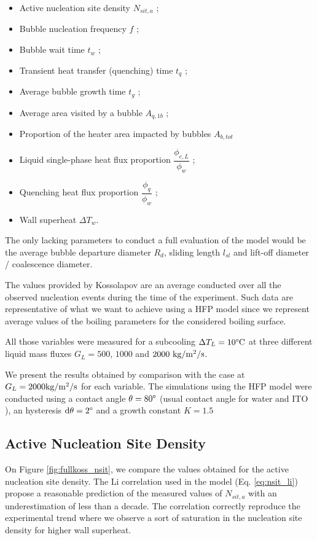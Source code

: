 \begin{itemize}
\item Active nucleation site density $N_{sit,a}$ ;
\item Bubble nucleation frequency $f$ ;
\item Bubble wait time $t_{w}$ ;
\item Transient heat transfer (quenching) time $t_{q}$ ;
\item Average bubble growth time $t_{g}$ ;
\item Average area visited by a bubble $A_{q,1b}$ ;
\item Proportion of the heater area impacted by bubbles $A_{b,tot}$
\item Liquid single-phase heat flux proportion $\dfrac{\phi_{c,L}}{\phi_{w}}$ ;
\item Quenching heat flux proportion $\dfrac{\phi_{q}}{\phi_{w}}$ ;
\item Wall superheat $\Delta T_{w}$.
\end{itemize}

The only lacking parameters to conduct a full evaluation of the model would be the average bubble departure diameter $R_{d}$, sliding length $l_{sl}$ and lift-off diameter / coalescence diameter.

The values provided by Kossolapov are an average conducted over all the observed nucleation events during the time of the experiment. Such data are representative of what we want to achieve using a HFP model since we represent average values of the boiling parameters for the considered boiling surface.

\npar

All those variables were measured for a subcooling $\Delta T_{L} = 10\degree\mathrm{C}$ at three different liquid mass fluxes $G_{L} = 500$, $1000$ and $2000~\text{kg/m$^{2}$/s}$. 

\npar

We present the results obtained by comparison with the case at $G_{L} = 2000 \text{kg/m$^{2}$/s}$ for each variable. The simulations using the HFP model were conducted using a contact angle $\theta = 80 \degree$ (usual contact angle for water and ITO \cite{kossolapov_experimental_2021}), an hysteresis $\mathrm{d}\theta = 2 \degree$ and a growth constant $K=1.5$

 
\subsection{Active Nucleation Site Density}

On Figure \ref{fig:fullkoss_nsit}, we compare the values obtained for the active nucleation site density. The Li \etal correlation used in the model (Eq. \ref{eq:nsit_li}) propose a reasonable prediction of the measured values of $N_{sit,a}$ with an underestimation of less than a decade. The correlation correctly reproduce the experimental trend where we observe a sort of saturation in the nucleation site density for higher wall superheat.

